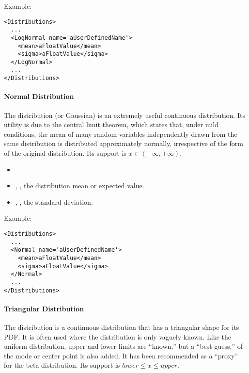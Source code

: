 Example:
\begin{lstlisting}[style=XML]
<Distributions>
  ...
  <LogNormal name='aUserDefinedName'>
    <mean>aFloatValue</mean>
    <sigma>aFloatValue</sigma>
  </LogNormal>
  ...
</Distributions>
\end{lstlisting}

\paragraph{Normal Distribution}
\label{Normal}
The  distribution (or Gaussian) is an extremely 
useful continuous distribution.
Its utility is due to the central limit theorem, which states that, under mild
conditions, the mean of many random variables independently drawn from the same
distribution is distributed approximately normally, irrespective of the form of
the original distribution.
%
Its support is $x \in (-\infty, +\infty)$.

%
\attrIntro
\vspace{-5mm}
\begin{itemize}
\itemsep0em
\item \nameDescription
\end{itemize}
\vspace{-5mm}
\subnodesIntro
\begin{itemize}
\item {}, , the distribution mean
  or expected value.
\item {}, , the standard
  deviation.
\end{itemize}

Example:
\begin{lstlisting}[style=XML]
<Distributions>
  ...
  <Normal name='aUserDefinedName'>
    <mean>aFloatValue</mean>
    <sigma>aFloatValue</sigma>
  </Normal>
  ...
</Distributions>
\end{lstlisting}

\paragraph{Triangular Distribution}
\label{Triangular}
The  distribution is a continuous distribution that has a
triangular shape for its PDF.
%
It is often used where the distribution is only vaguely known.
%
Like the uniform distribution, upper and lower limits are ``known,'' but a 
``best guess,'' of the mode or center point is also added.
%
It has been recommended as a ``proxy'' for the beta distribution.
%
Its support is $lower \le x \le upper$.


